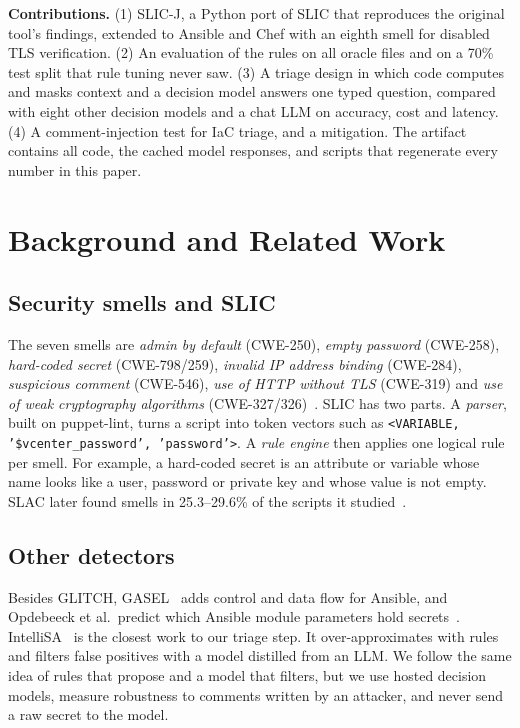 \documentclass[conference]{IEEEtran}
\newcommand{\slicj}{SLIC-J}
\begin{document}
\textbf{Contributions.} (1) \slicj{}, a Python port of SLIC that reproduces the original tool's findings, extended to
Ansible and Chef with an eighth smell for disabled TLS verification. (2) An evaluation of the rules on all oracle files
and on a 70\% test split that rule tuning never saw. (3) A triage design in which code computes and masks context and a
decision model answers one typed question, compared with eight other decision models and a chat LLM on accuracy,
cost and latency. (4) A comment-injection test for IaC triage, and a mitigation. The artifact contains all code, the
cached model responses, and scripts that regenerate every number in this paper.

\section{Background and Related Work}
\subsection{Security smells and SLIC}
The seven smells are \emph{admin by default} (CWE-250), \emph{empty password} (CWE-258), \emph{hard-coded secret}
(CWE-798/259), \emph{invalid IP address binding} (CWE-284), \emph{suspicious comment} (CWE-546), \emph{use of HTTP
without TLS} (CWE-319) and \emph{use of weak cryptography algorithms} (CWE-327/326)~\cite{rahman2019seven}.
SLIC has two parts. A \emph{parser}, built on puppet-lint, turns a script into token vectors such as
\texttt{<VARIABLE, '\$vcenter\_password', 'password'>}. A \emph{rule engine} then applies one logical rule per
smell. For example, a hard-coded secret is an attribute or variable whose name looks like a user, password or private
key and whose value is not empty. SLAC later found smells in 25.3--29.6\% of the scripts it
studied~\cite{rahman2021slac}.

\subsection{Other detectors}
Besides GLITCH, GASEL~\cite{opdebeeck2023gasel} adds control and data flow for Ansible, and Opdebeeck et al.\ predict
which Ansible module parameters hold secrets~\cite{opdebeeck2025smelling}. IntelliSA~\cite{mei2026intellisa} is the
closest work to our triage step. It over-approximates with rules and filters false positives with a model distilled
from an LLM. We follow the same idea of rules that propose and a model that filters, but we use hosted decision
models, measure robustness to comments written by an attacker, and never send a raw secret to the model.
\end{document}
